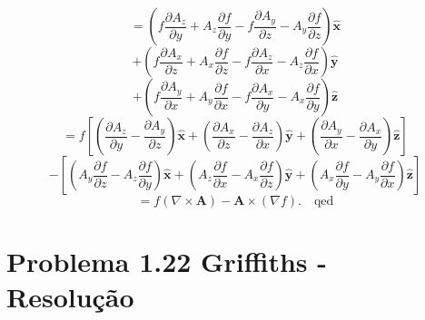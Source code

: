 \documentclass[a4paper,12pt]{article}
\begin{document}
\begin{itemize}
    \begin{equation}
    = \left( f \frac{\partial A_z}{\partial y} + A_z \frac{\partial f}{\partial y} - f \frac{\partial A_y}{\partial z} - A_y \frac{\partial f}{\partial z} \right) \hat{\mathbf{x}} 
    \end{equation}
    \begin{equation}
    + \left( f \frac{\partial A_x}{\partial z} + A_x \frac{\partial f}{\partial z} - f \frac{\partial A_z}{\partial x} - A_z \frac{\partial f}{\partial x} \right) \hat{\mathbf{y}}
    \end{equation}
    \begin{equation}
    + \left( f \frac{\partial A_y}{\partial x} + A_y \frac{\partial f}{\partial x} - f \frac{\partial A_x}{\partial y} - A_x \frac{\partial f}{\partial y} \right) \hat{\mathbf{z}}
    \end{equation}
    \begin{equation}
    = f \left[ \left( \frac{\partial A_z}{\partial y} - \frac{\partial A_y}{\partial z} \right) \hat{\mathbf{x}} 
    + \left( \frac{\partial A_x}{\partial z} - \frac{\partial A_z}{\partial x} \right) \hat{\mathbf{y}} 
    + \left( \frac{\partial A_y}{\partial x} - \frac{\partial A_x}{\partial y} \right) \hat{\mathbf{z}} \right]
    \end{equation}
    \begin{equation}
    - \left[ \left( A_y \frac{\partial f}{\partial z} - A_z \frac{\partial f}{\partial y} \right) \hat{\mathbf{x}} 
    + \left( A_z \frac{\partial f}{\partial x} - A_x \frac{\partial f}{\partial z} \right) \hat{\mathbf{y}} 
    + \left( A_x \frac{\partial f}{\partial y} - A_y \frac{\partial f}{\partial x} \right) \hat{\mathbf{z}} \right]
    \end{equation}
    \begin{equation}
    = f (\nabla \times \mathbf{A}) - \mathbf{A} \times (\nabla f). \quad \text{qed}
    \end{equation}

\end{itemize}

\section*{Problema 1.22 Griffiths - Resolu\c{c}\~ao}
\end{document}
